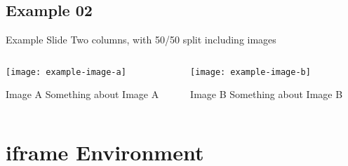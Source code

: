\documentclass[aspectratio=169]{beamer}
\begin{document}
\subsection{Example 02}

\begin{frame}[t]{Example Slide }{Two columns, with 50/50 split including images}

  \begin{columns}[T]
    \begin{column}{.5\textwidth}

      \texttt{[image: example-image-a]}

      \begin{exampleblock}{Image A}
        Something about \alert{Image A}
      \end{exampleblock}

    \end{column}

    \begin{column}{.5\textwidth}

      \texttt{[image: example-image-b]}

      \begin{alertblock}{Image B}
        Something about \alert{Image B}
      \end{alertblock}

    \end{column}
  \end{columns}

\end{frame}


\section{iframe Environment}
\end{document}

